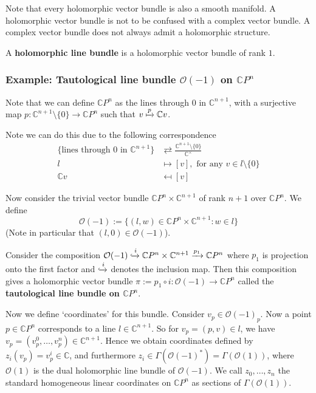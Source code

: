 \documentclass[a4paper]{article}
\theoremstyle{definition} \newtheorem*{definition}{Definition}
\theoremstyle{definition} \newtheorem*{definitions}{Definitions}
\theoremstyle{plain} \newtheorem{theorem}{Theorem}[section]
\theoremstyle{plain} \newtheorem{proposition}[theorem]{Proposition}
\theoremstyle{plain} \newtheorem{corollary}[theorem]{Corollary}
\theoremstyle{plain} \newtheorem{lemma}[theorem]{Lemma}
\theoremstyle{plain} \newtheorem{example}[theorem]{Example}
\newcommand{\defn}[1]{\textbf{#1}}
\newcommand{\complexnos}{\mathbb{C}}
\newcommand{\projCspace}{\complexnos P^n}
\begin{document}
Note that every holomorphic vector bundle is also a smooth manifold. A holomorphic vector bundle is not to be confused with a complex vector bundle. A complex vector bundle does not always admit a holomorphic structure. 

A \defn{holomorphic line bundle} is a holomorphic vector bundle of rank $1$.

\subsubsection{Example: Tautological line bundle $\mathcal{O}(-1)$ on $\complexnos P^n$ }
Note that we can define $\projCspace$ as the lines through $0$ in $\complexnos^{n+1}$, with a surjective map $p:\complexnos^{n+1}\setminus \{0\}\to \projCspace$ such that $v\xmapsto{p} \complexnos v$. 

Note we can do this due to the following correspondence 
\begin{align*}
    \{\text{lines through $0$ in $\complexnos^{n+1}$}\} & \rightleftarrows \frac{\complexnos^{n+1}\setminus \{0\}}{\complexnos^\times} \\
    l & \mapsto [v], \text{ for any } v\in l\setminus \{0\} \\
    \complexnos v & \mapsfrom [v]
\end{align*}

Now consider the trivial vector bundle $\projCspace \times \complexnos^{n+1}$ of rank $n+1$ over $\projCspace$. We define
$$\mathcal{O}(-1) := \{(l, w)\in \projCspace \times \complexnos^{n+1} : w\in l\}$$
(Note in particular that $(l, 0)\in \mathcal{O}(-1)$).

Consider the composition $\mathcal{O}(-1) \xhookrightarrow{i} \projCspace \times \complexnos^{n+1} \xrightarrow{p_1} \projCspace$ where $p_1$ is projection onto the first factor and $\xhookrightarrow{i}$ denotes the inclusion map. Then this composition gives a holomorphic vector bundle $\pi := p_1 \circ i: \mathcal{O}(-1) \to \projCspace$ called the \defn{tautological line bundle on $\complexnos P^n$}. 

Now we define `coordinates' for this bundle. Consider $v_p\in \mathcal{O}(-1)_p$. Now a point $p\in \complexnos P^n$ corresponds to a line $l\in \complexnos^{n+1}$. So for $v_p = (p, v)\in l$, we have $v_p = (v^0_p, \ldots, v^n_p) \in \complexnos^{n+1}$. Hence we obtain coordinates defined by $z_i(v_p)=v_p^i \in \complexnos$, and furthermore $z_i\in \Gamma(\mathcal{O}(-1)^*) = \Gamma(\mathcal{O}(1))$, where $\mathcal{O}(1)$ is the dual holomorphic line bundle of $\mathcal{O}(-1)$. We call $z_0, \ldots, z_n$ the standard homogeneous linear coordinates on $\projCspace$ as sections of $\Gamma(\mathcal{O}(1))$.
\end{document}
